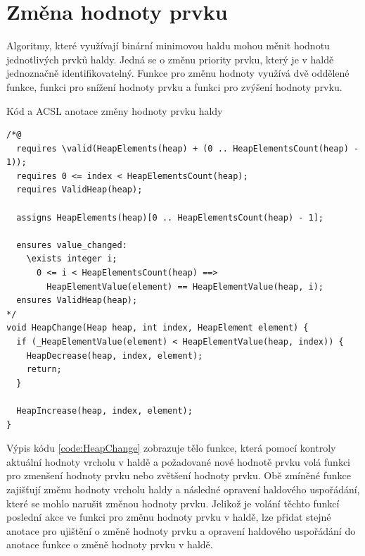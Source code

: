 \section{Změna hodnoty prvku}
\label{subsec:HeapChange}

Algoritmy, které využívají binární minimovou haldu mohou měnit hodnotu jednotlivých prvků haldy. Jedná se o změnu priority prvku, který je v haldě jednoznačně identifikovatelný. Funkce pro změnu hodnoty využívá dvě oddělené funkce, funkci pro snížení hodnoty prvku a funkci pro zvýšení hodnoty prvku.

\begin{listing}[H]
	\caption{Kód a ACSL anotace změny hodnoty prvku haldy}
	\label{code:HeapChange}
	\begin{verbatim}
/*@
  requires \valid(HeapElements(heap) + (0 .. HeapElementsCount(heap) - 1));
  requires 0 <= index < HeapElementsCount(heap);
  requires ValidHeap(heap);

  assigns HeapElements(heap)[0 .. HeapElementsCount(heap) - 1];

  ensures value_changed:
    \exists integer i;
      0 <= i < HeapElementsCount(heap) ==>
        HeapElementValue(element) == HeapElementValue(heap, i);
  ensures ValidHeap(heap);
*/
void HeapChange(Heap heap, int index, HeapElement element) {
  if (_HeapElementValue(element) < HeapElementValue(heap, index)) {
    HeapDecrease(heap, index, element);
    return;
  }

  HeapIncrease(heap, index, element);
}
	\end{verbatim}
\end{listing}

Výpis kódu \ref{code:HeapChange} zobrazuje tělo funkce, která pomocí kontroly aktuální hodnoty vrcholu v haldě a požadované nové hodnotě prvku volá funkci pro zmenšení hodnoty prvku nebo zvětšení hodnoty prvku. Obě zmíněné funkce zajišťují změnu hodnoty vrcholu haldy a následné opravení haldového uspořádání, které se mohlo narušit změnou hodnoty prvku. Jelikož je volání těchto funkcí poslední akce ve funkci pro změnu hodnoty prvku v haldě, lze přidat stejné anotace pro ujištění o změně hodnoty prvku a opravení haldového uspořádání do anotace funkce o změně hodnoty prvku v haldě.

